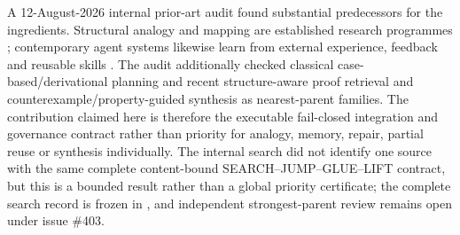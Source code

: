 A 12-August-2026 internal prior-art audit found substantial predecessors for the ingredients. Structural analogy and mapping are established research programmes \cite{gentner1983,holyoak1989}; contemporary agent systems likewise learn from external experience, feedback and reusable skills \cite{shinn2023,madaan2023,shen2026}. The audit additionally checked classical case-based/derivational planning and recent structure-aware proof retrieval and counterexample/property-guided synthesis as nearest-parent families. The contribution claimed here is therefore the executable fail-closed integration and governance contract rather than priority for analogy, memory, repair, partial reuse or synthesis individually. The internal search did not identify one source with the same complete content-bound SEARCH--JUMP--GLUE--LIFT contract, but this is a bounded result rather than a global priority certificate; the complete search record is frozen in , and independent strongest-parent review remains open under issue \#403.
